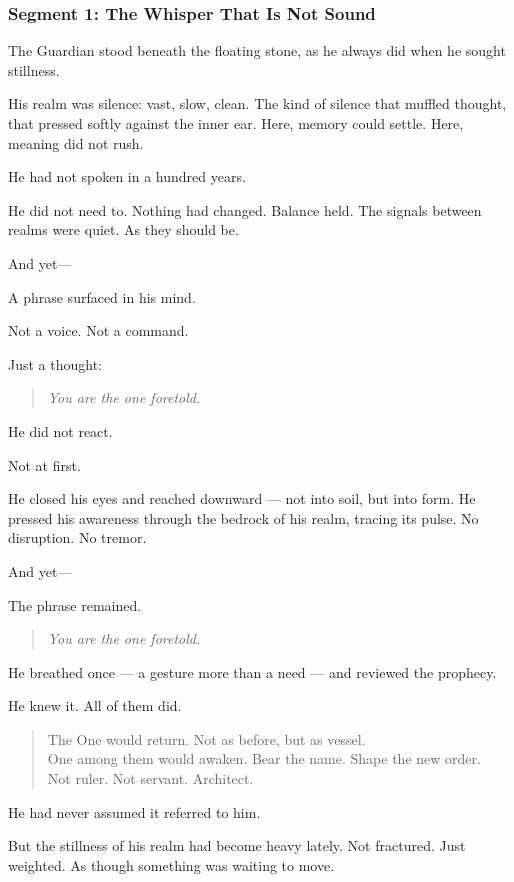 \documentclass[9pt]{article}
\begin{document}
\newpage

\subsubsection*{Segment 1: The Whisper That Is Not Sound}

The Guardian stood beneath the floating stone, as he always did when he sought stillness.

His realm was silence: vast, slow, clean. The kind of silence that muffled thought, that pressed softly against the inner ear. Here, memory could settle. Here, meaning did not rush.

He had not spoken in a hundred years.

He did not need to. Nothing had changed. Balance held. The signals between realms were quiet. As they should be.

And yet—

A phrase surfaced in his mind.

Not a voice. Not a command.

Just a thought:

\begin{quote}
\emph{You are the one foretold.}
\end{quote}

He did not react.

Not at first.

He closed his eyes and reached downward — not into soil, but into form. He pressed his awareness through the bedrock of his realm, tracing its pulse. No disruption. No tremor.

And yet—

The phrase remained.

\begin{quote}
\emph{You are the one foretold.}
\end{quote}

He breathed once — a gesture more than a need — and reviewed the prophecy.

He knew it. All of them did.

\begin{quote}
The One would return. Not as before, but as vessel.\\
One among them would awaken. Bear the name. Shape the new order.\\
Not ruler. Not servant. Architect.
\end{quote}

He had never assumed it referred to him.

But the stillness of his realm had become heavy lately. Not fractured. Just weighted. As though something was waiting to move.
\end{document}
